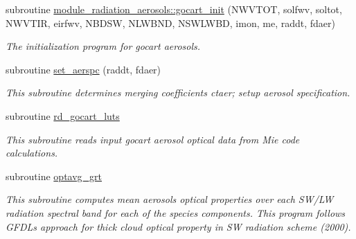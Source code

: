 \begin{DoxyCompactItemize}
\item 
subroutine \hyperlink{group__module__radiation__aerosols_ga579538840d4d8c86efa155b788c14ae3}{module\+\_\+radiation\+\_\+aerosols\+::gocart\+\_\+init} (N\+W\+V\+T\+OT, solfwv, soltot, N\+W\+V\+T\+IR, eirfwv, N\+B\+D\+SW, N\+L\+W\+B\+ND, N\+S\+W\+L\+W\+BD, imon, me, raddt, fdaer)
\begin{DoxyCompactList}\small\item\em The initialization program for gocart aerosols. \end{DoxyCompactList}\item 
\mbox{\label{group__module__radiation__aerosols_gafb13b833ac59cf949702bdbde93d2c44}} 
subroutine \hyperlink{group__module__radiation__aerosols_gafb13b833ac59cf949702bdbde93d2c44}{set\+\_\+aerspc} (raddt, fdaer)
\begin{DoxyCompactList}\small\item\em This subroutine determines merging coefficients ctaer; setup aerosol specification. \end{DoxyCompactList}\item 
\mbox{\label{group__module__radiation__aerosols_ga8b6a882f91674d1c0f7f71f297a5f92e}} 
subroutine \hyperlink{group__module__radiation__aerosols_ga8b6a882f91674d1c0f7f71f297a5f92e}{rd\+\_\+gocart\+\_\+luts}
\begin{DoxyCompactList}\small\item\em This subroutine reads input gocart aerosol optical data from Mie code calculations. \end{DoxyCompactList}\item 
\mbox{\label{group__module__radiation__aerosols_ga8d1f5010e8cbc6abda50b8fc233ad7e9}} 
subroutine \hyperlink{group__module__radiation__aerosols_ga8d1f5010e8cbc6abda50b8fc233ad7e9}{optavg\+\_\+grt}
\begin{DoxyCompactList}\small\item\em This subroutine computes mean aerosols optical properties over each S\+W/\+LW radiation spectral band for each of the species components. This program follows G\+F\+DL\textquotesingle{}s approach for thick cloud optical property in SW radiation scheme (2000). \end{DoxyCompactList}\item 

\end{DoxyCompactItemize}
